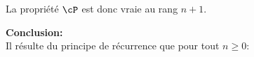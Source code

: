 \begin{correction}
\begin{enumerate}
\begin{enumerate}
La propriété $\cP$ est donc vraie au rang $n+1$.

\textbf{Conclusion:}\\
Il r\'esulte du principe de r\'ecurrence que pour tout $ n\geq 0$:
\begin{center}
\end{center}




\end{enumerate}



\end{enumerate}
\end{correction}